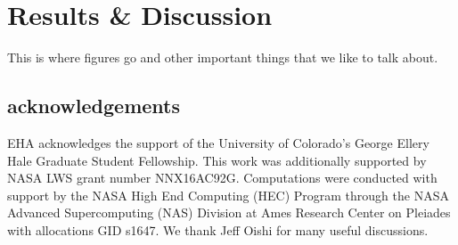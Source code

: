 \documentclass[aps, prl, twocolumn, nofootinbib, groupedaddress, amsfonts, amssymb, amsmath]{revtex4-1}
\begin{document}
\section{Results \& Discussion}
\label{sec:results}
This is where figures go and other important things that we like to talk about.



\subsection{acknowledgements}
EHA acknowledges the support of the University of Colorado's George 
Ellery Hale Graduate Student Fellowship.
This work was additionally supported by  NASA LWS grant number NNX16AC92G.  
Computations were conducted 
with support by the NASA High End Computing (HEC) Program through the NASA 
Advanced Supercomputing (NAS) Division at Ames Research Center on Pleiades
with allocations GID s1647.
We thank  Jeff Oishi for many useful discussions. 


\end{document}
